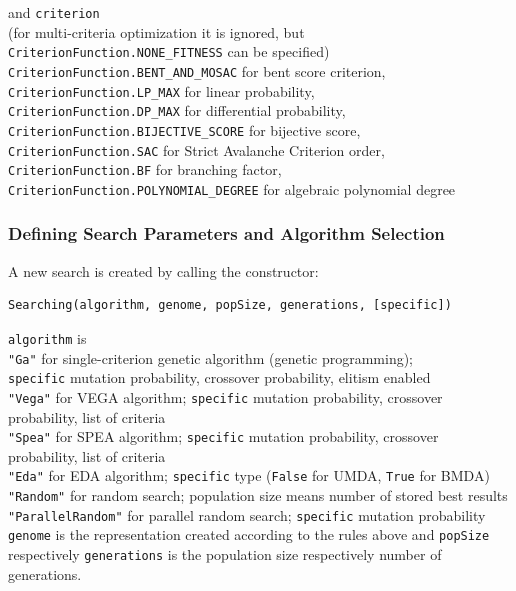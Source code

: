 and \verb|criterion| \\
(for multi-criteria optimization it is ignored, but \verb|CriterionFunction.NONE_FITNESS| can be specified)
\verb|CriterionFunction.BENT_AND_MOSAC| for bent score criterion,\\
\verb|CriterionFunction.LP_MAX| for linear probability, \\
\verb|CriterionFunction.DP_MAX| for differential probability,\\
\verb|CriterionFunction.BIJECTIVE_SCORE| for bijective score,\\
\verb|CriterionFunction.SAC| for Strict Avalanche Criterion order,\\
\verb|CriterionFunction.BF| for branching factor,\\
\verb|CriterionFunction.POLYNOMIAL_DEGREE| for algebraic polynomial degree

\subsubsection{Defining Search Parameters and Algorithm Selection}
A new search is created by calling the constructor:
\begin{verbatim}
Searching(algorithm, genome, popSize, generations, [specific])
\end{verbatim}
\verb|algorithm| is\\
\verb|"Ga"| for single-criterion genetic algorithm (genetic programming); \\ \verb|specific| mutation probability,
 crossover probability, elitism enabled\\
\verb|"Vega"| for VEGA algorithm; \verb|specific| mutation probability,
 crossover probability, list of criteria\\
\verb|"Spea"| for SPEA algorithm; \verb|specific| mutation probability,
 crossover probability, list of criteria\\
\verb|"Eda"| for EDA algorithm; \verb|specific| type (\verb|False| for UMDA, \verb|True| for BMDA)\\
\verb|"Random"| for random search; population size means number of stored best results\\
\verb|"ParallelRandom"| for parallel random search; \verb|specific| mutation probability\\

\verb|genome| is the representation created according to the rules above
and \verb|popSize| respectively \verb|generations| is the population size respectively number of generations.


